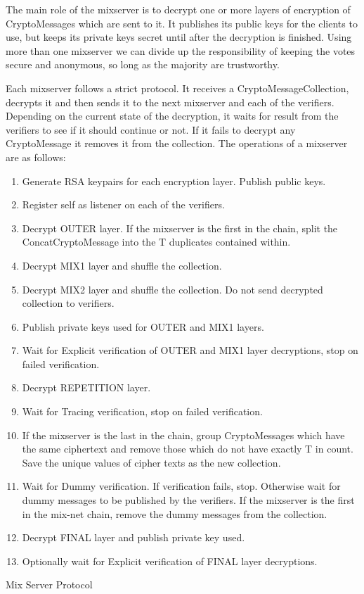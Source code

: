 \documentclass[a4paper,11pt]{kth-mag}
\begin{document}
The main role of the mixserver is to decrypt one or more layers of encryption of CryptoMessages which are sent to it. It publishes its public keys for the clients to use, but keeps its private keys secret until after the decryption is finished.  Using more than one mixserver we can divide up the responsibility of keeping the votes secure and anonymous, so long as the majority are trustworthy.

Each mixserver follows a strict protocol. It receives a CryptoMessageCollection, decrypts it and then sends it to the next mixserver and each of the verifiers. Depending on the current state of the decryption, it waits for result from the verifiers to see if it should continue or not. If it fails to decrypt any CryptoMessage it removes it from the collection. The operations of a mixserver are as follows:

\begin{framed}
\begin{enumerate}
   \item Generate RSA keypairs for each encryption layer. Publish public keys.
   \item  Register self as listener on each of the verifiers.
   \item     Decrypt OUTER layer. If the mixserver is the first in the chain, split the ConcatCryptoMessage into the T duplicates contained within.
   \item     Decrypt MIX1 layer and shuffle the collection.
   \item     Decrypt MIX2 layer and shuffle the collection. Do not send decrypted collection to verifiers.
   \item     Publish private keys used for OUTER and MIX1 layers.
   \item     Wait for Explicit verification of OUTER and MIX1 layer decryptions, stop on failed verification.
   \item     Decrypt REPETITION layer.
   \item     Wait for Tracing verification, stop on failed verification.
   \item     If the mixserver is the last in the chain, group CryptoMessages which have the same ciphertext and remove those which do not have exactly T in count. Save the unique values of cipher texts as the new collection.
   \item     Wait for Dummy verification. If verification fails, stop. Otherwise wait for dummy messages to be published by the verifiers. If the mixserver is the first in the mix-net chain, remove the dummy messages from the collection.
   \item     Decrypt FINAL layer and publish private key used.
   \item     Optionally wait for Explicit verification of FINAL layer decryptions. 
\end{enumerate}
\end{framed}
\begin{center}
Mix Server Protocol
\end{center}
\end{document}
